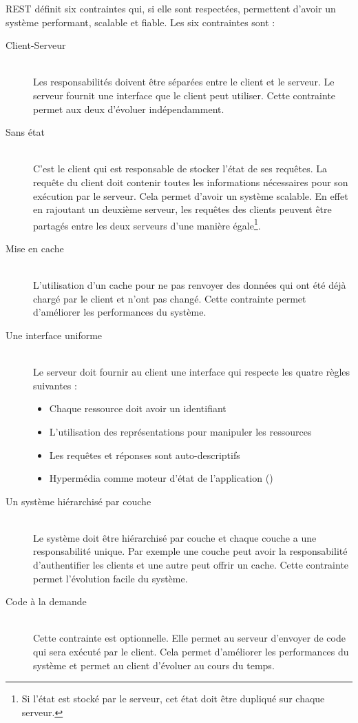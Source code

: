 REST définit six contraintes qui, si elle sont respectées, permettent d'avoir un système performant, scalable et fiable. Les six contraintes sont :

\begin{description}
\item[Client-Serveur]\hfill\\
Les responsabilités doivent être séparées entre le client et le serveur. Le serveur fournit une interface que le client peut utiliser. Cette contrainte permet aux deux d'évoluer indépendamment.

\item[Sans état]\hfill\\
C'est le client qui est responsable de stocker l'état de ses requêtes. La requête du client doit contenir toutes les informations nécessaires pour son exécution par le serveur. Cela permet d'avoir un système scalable. En effet en rajoutant un deuxième serveur, les requêtes des clients peuvent être partagés entre les deux serveurs d'une manière égale\footnote{Si l'état est stocké par le serveur, cet état doit être dupliqué sur chaque serveur.}.

\item[Mise en cache]\hfill\\
L'utilisation d'un cache pour ne pas renvoyer des données qui ont été déjà chargé par le client et n'ont pas changé. Cette contrainte permet d'améliorer les performances du système.

\item[Une interface uniforme]\hfill\\
Le serveur doit fournir au client une interface qui respecte les quatre règles suivantes :
\begin{itemize}
\item Chaque ressource doit avoir un identifiant
\item L'utilisation des représentations pour manipuler les ressources
\item Les requêtes et réponses sont auto-descriptifs
\item Hypermédia comme moteur d'état de l'application ()	 
\end{itemize} 

\item[Un système hiérarchisé par couche]\hfill\\
Le système doit être hiérarchisé par couche et chaque couche a une responsabilité unique. Par exemple une couche peut avoir la responsabilité d'authentifier les clients et une autre peut offrir un cache. Cette contrainte permet l'évolution facile du système.

\item[Code à la demande]\hfill\\
Cette contrainte est optionnelle. Elle permet au serveur d'envoyer de code qui sera exécuté par le client. Cela permet d'améliorer les performances du système et permet au client d'évoluer au cours du temps.
\end{description}

